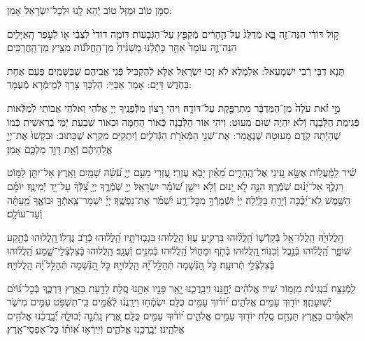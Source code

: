 \documentclass[twoside, openany, parskip=half, 11pt]{book}
\begin{document}
סִמָּן טוֹב וּמַזָּל טוֹב יְֿהֵא לָֽנוּ וּלְכׇל־יִשְׂרָאֵל אָמֵן:

ק֣וֹל דּוֹדִ֔י הִנֵּה־זֶ֖ה בָּ֑א מְֿדַלֵּג֙ עַל־הֶ֣הָרִ֔ים מְֿקַפֵּ֖ץ עַל־הַגְּֿבָעֽוֹת׃ דּוֹמֶ֤ה דוֹדִי֙ לִצְבִ֔י א֖וֹ לְֿעֹ֣פֶר הָֽאַיָּלִ֑ים הִנֵּה־זֶ֤ה עוֹמֵד֙ אַחַ֣ר כָּתְֿלֵ֔נוּ מַשְׁגִּ֨יחַ֙ מִן־הַֽחֲלֹּנ֔וֹת מֵצִ֖יץ מִן־הַֽחֲרַכִּֽים׃

תָּנָא דִבֵּי רְֿבִי יִשְׁמָעֵאל: אִלְמָלֵא לֹא זָכוּ יִשְׂרָאֵל אֶלָּא לְֿהַקְבִּיל פְּֿנֵי אֲבִיהֶם שֶׁבַּשָּׁמַֽיִם פַּעַם אֶחָת בַּחֹֽדֶשׁ דַּיָּם: אָמַר אַבַּיֵּי: הִלְכָּךְ צָרֵךְ לְֿמֵימְֿרָא מְֿעֻמָּד:

מִ֣י זֹ֗את עֹלָה֙ מִן־הַמִּדְבָּ֔ר מִתְרַפֶּ֖קֶת עַל־דּוֹדָ֑הּ׃
וִיהִי רָצוֹן מִלְּֿפָנֶֽיךָ יְיָ אֱלֹהַי וֵאלֹהֵי אֲבוֹתַי לְֿמַלְּֿאוֹת פְּֿגִימַת הַלְּֿבָנָה וְֿלֹא יִהְיֶה שׁוּם מִעוּט: וִיהִי אוֹר הַלְּֿבָנָה כְּֿאוֹר הַחַמָּה וּכְאוֹר שִׁבְעַת יְֿמֵי בְֿרֵאשִׁית כְּֿמוֹ שֶׁהָיְֿתָה קֹֽדֶם מִעוּטָהּ שֶׁנֶּאֱמַר:
אֶת־שְׁנֵ֥י הַמְּֿאֹרֹ֖ת הַגְּֿדֹלִ֑ים וְֿיִתְקַיַּם מִקְרָא שֶׁכָּתוּב: וּבִקְשׁוּ֙ אֶת־יְיָ֣ אֱלֹֽהֵיהֶ֔ם וְֿאֵ֖ת דָּוִ֣ד מַלְכָּ֑ם אָמֵן׃


שִׁ֗יר לַֽמַּֽ֫עֲל֥וֹת אֶשָּׂ֣א עֵ֭ינַי אֶל־הֶֽהָרִ֑ים מֵ֝אַ֗יִן יָבֹ֥א עֶזְרִֽי׃ עֶ֭זְרִי מֵעִ֣ם יְיָ֑ עֹ֝שֵׂ֗ה שָׁמַ֥יִם וָאָֽרֶץ׃ אַל־יִתֵּ֣ן לַמּ֣וֹט רַגְלֶ֑ךָ אַל־יָ֝נ֗וּם שֹֽׁמְֿרֶֽךָ׃ הִנֵּ֤ה לֹ֣א יָ֭נוּם וְֿלֹ֣א יִישָׁ֑ן שׁ֝וֹמֵ֗ר יִשְׂרָאֵֽל׃ יְיָ֥ שֹֽׁמְֿרֶ֑ךָ יְיָ֥ צִ֝לְּֿךָ֗ עַל־יַ֥ד יְֿמִינֶֽךָ׃ יוֹמָ֗ם הַשֶּׁ֥מֶשׁ לֹֽא־יַ֝כֶּ֗כָּה וְֿיָרֵ֥חַ בַּלָּֽיְֿלָה׃ יְיָ֗ יִשְֿׁמָרְֿךָ֥ מִכׇּל־רָ֑ע יִ֝שְׁמֹ֗ר אֶת־נַפְשֶֽׁךָ׃ יְיָ֗ יִשְׁמָר־צֵֽאתְֿךָ֥ וּבוֹאֶ֑ךָ מֵֽ֝עַתָּ֗ה וְֿעַד־עוֹלָֽם׃

הַֽלֲלוּיָ֙הּ הַֽלֲלוּ־אֵ֥ל בְּֿקָדְֿשׁ֑וֹ הַֽ֝לֲל֗וּהוּ בִּרְקִ֥יעַ עֻזּֽוֹ׃
הַֽלֲלוּהוּ בִּגְבֽוּרֹתָ֑יו הַֽ֝לֲל֗וּהוּ כְּֿרֹ֣ב גֻּדְלֽוֹ׃
֖הַֽלֲלוּהוּ בְּֿתֵ֣קַע שׁוֹפָ֑ר הַֽ֝לֲל֗וּהוּ בְּֿנֵ֣בֶל וְֿכִנּֽוֹר׃
֖הַֽלֲלוּהוּ בְּֿתֹ֣ף וּמָח֑וֹל הַֽ֝לֲל֗וּהוּ בְּֿמִנִּ֥ים וְֿעֻגָֽב׃
הַֽלֲלוּהוּ בְּֽֿצִלְצְֿלֵי־שָׁ֑מַע הַֽ֝לֲל֗וּהוּ בְּֽֿצִלְצְֿלֵ֥י תְֿרוּעָֽה׃
כֹּ֣ל הַ֭נְּֿשָׁמָה תְּֿהַלֵּ֥ל ֝יָ֗הּ הַֽלֲלוּיָֽהּ׃
כֹּ֣ל הַ֭נְּֿשָׁמָה תְּֿהַלֵּ֥ל ֝יָ֗הּ הַֽלֲלוּיָֽהּ׃

\enlargethispage{\baselineskip}
לַֽמְֿנַצֵּ֥ח
בִּ֝נְגִינֹ֗ת מִזְמ֥וֹר שִֽׁיר׃ אֱלֹהִ֗ים יְֿחׇׇׇׇָנֵּ֥נוּ וִֽיבָֽרֲכֵ֑נוּ יָ֤אֵ֥ר פָּנָ֖יו אִתָּ֣נוּ סֶֽלָה׃ לָדַ֣עַת בָּאָ֣רֶץ דַּרְכֶּ֑ךָ בְּֿכׇל־גּ֝וֹיִ֗ם יְֿשֽׁוּעָתֶֽךָ׃ יוֹד֖וּךָ עַמִּ֥ים אֱלֹהִ֑ים י֝וֹד֗וּךָ עַמִּ֥ים כֻּלָּֽם׃ יִשְׂמְֿח֥וּ וִירַֽנֲנ֗וּ לְֿאֻ֫מִּ֥ים כִּֽי־תִשְׁפֹּ֣ט עַמִּ֣ים מִישֹׁ֑ר וּלְאֻמִּ֓ים בָּאָ֖רֶץ תַּנְחֵ֣ם סֶֽלָה׃ יוֹד֖וּךָ עַמִּ֥ים אֱלֹהִ֑ים י֝וֹד֗וּךָ עַמִּ֥ים כֻּלָּֽם׃ אֶ֭רֶץ נָֽתְֿנָ֣ה יְֿבוּלָ֑הּ יְֿ֝בָֽרֲכֵ֗נוּ אֱלֹהִ֥ים אֱלֹהֵֽינוּ׃ יְֿבָֽרֲכֵ֥נוּ אֱלֹהִ֑ים וְֿיִֽירְֿא֥וּ א֝וֹת֗וֹ כׇּל־אַפְסֵי־אָֽרֶץ׃
\end{document}
